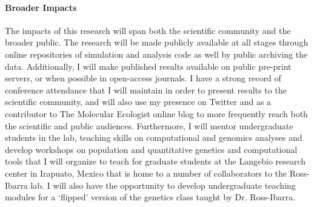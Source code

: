 \vspace{-0.4cm}

\paragraph{Broader Impacts}

The impacts of this research will span both the scientific community and the broader public. The research will be made publicly available at all stages through online repositories of simulation and analysis code as well by public archiving the data. Additionally, I will make published results available on public pre-print servers, or when possible in open-access journals. I have a strong record of conference attendance that I will maintain in order to present results to the scientific community, and will also use my presence on Twitter and as a contributor to The Molecular Ecologist online blog to more frequently reach both the scientific and public audiences. Furthermore, I will mentor undergraduate students in the lab, teaching skills on computational and genomics analyses and develop workshops on population and quantitative genetics and computational tools that I will organize to teach for graduate students at the Langebio research center in Irapuato, Mexico that is home to a number of collaborators to the Ross-Ibarra lab.  I will also have the opportunity to develop undergraduate teaching modules for a `flipped' version of the genetics class taught by Dr. Ross-Ibarra.







